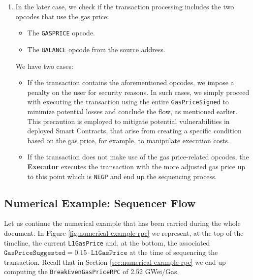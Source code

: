 \begin{enumerate}
\item In the later case, we check if the transaction processing includes the two opcodes that use the gas price:

\begin{itemize}[-]

\item The \texttt{GASPRICE} opcode.

\item The \texttt{BALANCE} opcode from the source address.

\end{itemize}

We have two cases:

\begin{itemize}

\item If the transaction contains the aforementioned opcodes, we impose a penalty on the user for security reasons. In such cases, we simply proceed with executing the transaction using the entire \texttt{GasPriceSigned} to minimize potential losses and conclude the flow, as mentioned earlier. This precaution is employed to mitigate potential vulnerabilities in deployed Smart Contracts, that arise from creating a specific condition based on the gas price, for example, to manipulate execution costs.

\item If the transaction does not make use of the gas price-related opcodes, the \textbf{Executor} executes the transaction with the more adjusted gas price up to this point which is \texttt{NEGP} and end up the sequencing process.

\end{itemize}

\end{enumerate}



\subsection{Numerical Example: Sequencer Flow}


Let us continue the numerical example that has been carried during the whole document. In Figure \ref{fig:numerical-example-rpc} we represent, at the top of the timeline, the current \texttt{L1GasPrice} and, at the bottom, the associated $\texttt{GasPriceSuggested} = 0.15 \cdot \texttt{L1GasPrice}$ at the time of sequencing the transaction. Recall that in Section \ref{sec:numerical-example-rpc} we end up computing the \texttt{BreakEvenGasPriceRPC} of $2.52$ GWei/Gas.


